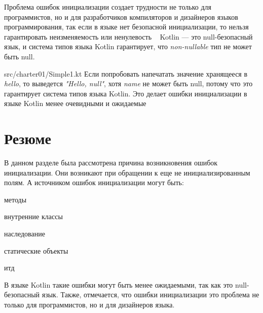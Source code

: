 Проблема ошибок инициализации создает трудности не только для программистов,
но и для разработчиков компиляторов и дизайнеров языков программирования,
так если в языке нет безопасной инициализации, то нельзя гарантировать неизменяемость или ненулевость
~\cite{joe-duffy}
Kotlin --- это null-безопасный язык, и система типов языка Kotlin гарантирует, что \emph{non-nullable} тип не может быть null.

{src/charter01/Simple1.kt}
Если попробовать напечатать значение хранящееся в \emph{hello}, то выведется \emph{"Hello, null"},
хотя \emph{name} не может быть null, потому что это гарантирует система типов языка Kotlin.
Это делает ошибки инициализации в языке Kotlin менее очевидными и ожидаемые


\section{Резюме}\label{sec:проблема-резюме}

В данном разделе была рассмотрена причина возникновения ошибок инициализации.
Они возникают при обращении к еще не инициализированным полям.
А источником ошибок инициализации могут быть:
\begin{itemize*}
    \item методы
    \item внутренние классы
    \item наследование
    \item статические объекты
    \item итд
\end{itemize*}
В языке Kotlin такие ошибки могут быть менее ожидаемыми, так как это null-безопасный язык.
Также, отмечается, что ошибки инициализации это проблема не только для программистов, но и для дизайнеров языка.